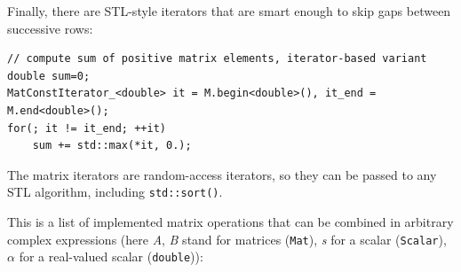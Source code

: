 Finally, there are STL-style iterators that are smart enough to skip gaps between successive rows:
\begin{lstlisting}
// compute sum of positive matrix elements, iterator-based variant
double sum=0;
MatConstIterator_<double> it = M.begin<double>(), it_end = M.end<double>();
for(; it != it_end; ++it)
    sum += std::max(*it, 0.);
\end{lstlisting}

The matrix iterators are random-access iterators, so they can be passed to any STL algorithm, including \texttt{std::sort()}.

\label{Matrix Expressions}

This is a list of implemented matrix operations that can be combined in arbitrary complex expressions
(here \emph{A}, \emph{B} stand for matrices (\texttt{Mat}), \emph{s} for a scalar (\texttt{Scalar}),
\emph{$\alpha$} for a real-valued scalar (\texttt{double})):

